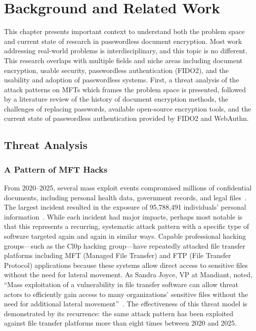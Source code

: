 \chapter{Background and Related Work}
\label{ch:background}

This chapter presents important context to understand both the problem space and current state of research in passwordless document encryption. Most work addressing real-world problems is interdisciplinary, and this topic is no different. This research overlaps with multiple fields and niche areas including document encryption, usable security, passwordless authentication (FIDO2), and the usability and adoption of passwordless systems. First, a threat analysis of the attack patterns on MFTs which frames the problem space is presented, followed by a literature review of the history of document encryption methods, the challenges of replacing passwords, available open-source encryption tools, and the current state of passwordless authentication provided by FIDO2 and WebAuthn.

\section{Threat Analysis}
\label{sec:threat-analysis}

\subsection{A Pattern of MFT Hacks}
\label{sec:mft-hacks}

From 2020--2025, several mass exploit events compromised millions of confidential documents, including personal health data, government records, and legal files~\cite{kondruss_moveit_2023}. The largest incident resulted in the exposure of 95{,}788{,}491 individuals' personal information~\cite{simas_unpacking_2023}. While each incident had major impacts, perhaps most notable is that this represents a recurring, systematic attack pattern with a specific type of software targeted again and again in similar ways. Capable professional hacking groups---such as the Cl0p hacking group---have repeatedly attacked file transfer platforms including MFT (Managed File Transfer) and FTP (File Transfer Protocol) applications because these systems allow direct access to sensitive files without the need for lateral movement. As Sandra Joyce, VP at Mandiant, noted, ``Mass exploitation of a vulnerability in file transfer software can allow threat actors to efficiently gain access to many organizations' sensitive files without the need for additional lateral movement''~\cite{joyce_ciso_2023}. The effectiveness of this threat model is demonstrated by its recurrence: the same attack pattern has been exploited against file transfer platforms more than eight times between 2020 and 2025.

